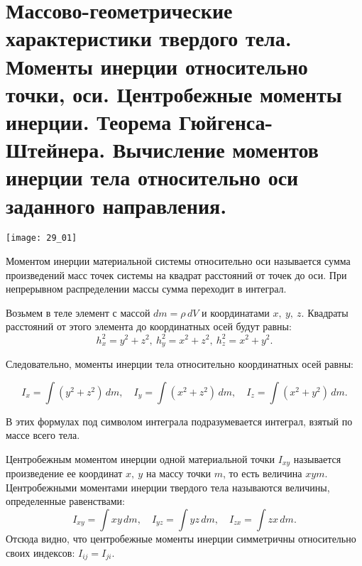\chapter{Массово-геометрические характеристики твердого тела. Моменты инерции
относительно точки, оси. Центробежные моменты инерции. Теорема
Гюйгенса-Штейнера. Вычисление моментов инерции тела относительно оси
заданного направления.}

\begin{minipage}{.38\textwidth}
    \texttt{[image: 29\_01]}
\end{minipage} \hfill
\begin{minipage}{.57\textwidth}
    Моментом инерции материальной системы относительно оси называется сумма
    произведений масс точек системы на квадрат расстояний от точек до оси. При
    непрерывном распределении массы сумма переходит в интеграл.

    Возьмем в теле элемент с массой \( dm = \rho\,dV \) и координатами
    \( x,\ y,\ z \). Квадраты расстояний от этого элемента до координатных осей
    будут равны:
    \[
        h_x^2 = y^2 + z^2,\ h_y^2 = x^2 + z^2,\ h_z^2 = x^2 + y^2.
    \]
    
    Следовательно, моменты инерции тела относительно координатных осей равны:
\end{minipage}
\[
    I_x = \int(y^2 + z^2)\,dm, \quad I_y = \int(x^2 + z^2)\,dm, \quad
    I_z = \int(x^2 + y^2)\,dm.
\]

В этих формулах под символом интеграла подразумевается интеграл, взятый по массе
всего тела.

Центробежным моментом инерции одной материальной точки \( I_{xy} \) называется
произведение ее координат \( x,\ y \) на массу точки \( m \), то есть величина
\( xym \). Центробежными моментами инерции твердого тела называются величины,
определенные равенствами:
\[
    I_{xy} = \int xy\,dm,\quad I_{yz} = \int yz\,dm,\quad I_{zx} = \int zx\,dm.
\]
Отсюда видно, что центробежные моменты инерции симметричны относительно своих индексов:
\( I_{ij} = I_{ji} \).

